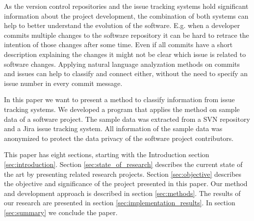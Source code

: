 As the version control repositories and the issue tracking systems hold significant information about the project development, the combination of both systems can help to better understand the evolution of the software. E.g. when a developer commits multiple changes to the software repository it can be hard to retrace the intention of those changes after some time. Even if all commits have a short description explaining the changes it might not be clear which issue is related to software changes. Applying natural language analyzation methods on commits and issues can help to classify and connect either, without the need to specify an issue number in every commit message.

In this paper we want to present a method to classify information from issue tracking systems. We developed a program that applies the method on sample data of a software project. The sample data was extracted from a SVN repository and a Jira issue tracking system. All information of the sample data was anonymized to protect the data privacy of the software project contributors.

This paper has eight sections, starting with the Introduction section \ref{sec:introduction}. Section \ref{sec:state_of_research} describes the current state of the art by presenting related research projects. Section \ref{sec:objective} describes the objective and significance of the project presented in this paper. Our method and development approach is described in section \ref{sec:methods}. The results of our research are presented in section \ref{sec:implementation_results}. In section \ref{sec:summary} we conclude the paper.